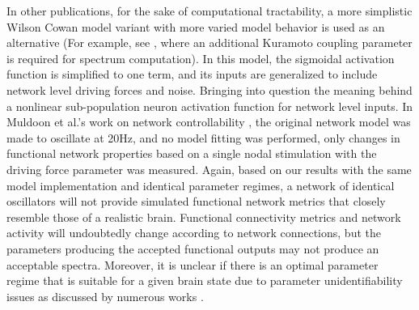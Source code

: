 In other publications, for the sake of computational tractability, a more simplistic Wilson Cowan model variant with more varied model behavior is used as an alternative (For example, see \cite{Deco2009}, where an additional Kuramoto coupling parameter is required for spectrum computation). In this model, the sigmoidal activation function is simplified to one term, and its inputs are generalized to include network level driving forces and noise. Bringing into question the meaning behind a nonlinear sub-population neuron activation function for network level inputs. In Muldoon et al.'s work on network controllability \cite{muldoon_stimulation-based_2016}, the original network model was made to oscillate at 20Hz, and no model fitting was performed, only changes in functional network properties based on a single nodal stimulation with the driving force parameter was measured. Again, based on our results with the same model implementation and identical parameter regimes, a network of identical oscillators will not provide simulated functional network metrics that closely resemble those of a realistic brain. Functional connectivity metrics and network activity will undoubtedly change according to network connections, but the parameters producing the accepted functional outputs may not produce an acceptable spectra. Moreover, it is unclear if there is an optimal parameter regime that is suitable for a given brain state due to parameter unidentifiability issues as discussed by numerous works \cite{hartoyo_parameter_2019, chis_relationship_2016, villaverde_observability_2019}.

